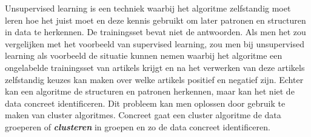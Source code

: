 Unsupervised learning is een techniek waarbij het algoritme zelfstandig moet leren hoe het juist moet en deze kennis gebruikt om later patronen en structuren in data te herkennen. De trainingsset bevat niet de antwoorden.
\newline
Als men het zou vergelijken met het voorbeeld van supervised learning, zou men bij unsupervised learning als voorbeeld de situatie kunnen nemen waarbij het algoritme een ongelabelde trainingsset van artikels krijgt en na het verwerken van deze artikels zelfstandig keuzes kan maken over welke artikels positief en negatief zijn.
\newline
Echter kan een algoritme de structuren en patronen herkennen, maar kan het niet de data concreet identificeren. Dit probleem kan men oplossen door gebruik te maken van cluster algoritmes. Concreet gaat een cluster algoritme de data groeperen of \textbf{\textit{clusteren}} in groepen en zo de data concreet identificeren.



